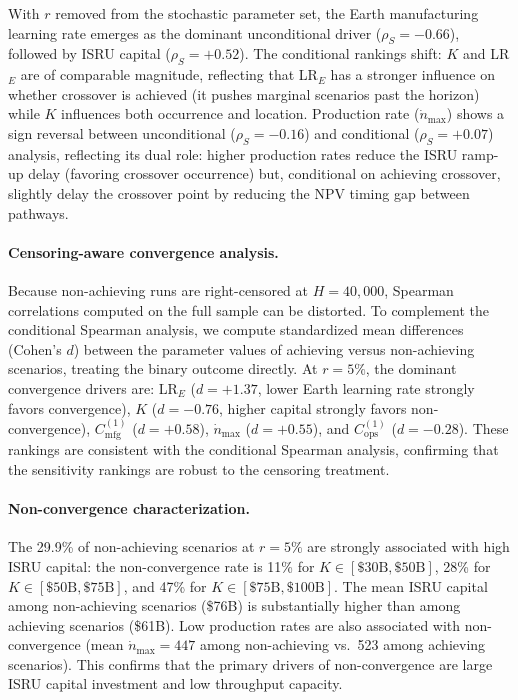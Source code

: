 \documentclass[preprint,12pt]{elsarticle}
\begin{document}
With $r$ removed from the stochastic parameter set, the Earth manufacturing learning rate emerges as the dominant unconditional driver ($\rho_S = -0.66$), followed by ISRU capital ($\rho_S = +0.52$). The conditional rankings shift: $K$ and LR$_E$ are of comparable magnitude, reflecting that LR$_E$ has a stronger influence on whether crossover is achieved (it pushes marginal scenarios past the horizon) while $K$ influences both occurrence and location. Production rate ($\dot{n}_{\max}$) shows a sign reversal between unconditional ($\rho_S = -0.16$) and conditional ($\rho_S = +0.07$) analysis, reflecting its dual role: higher production rates reduce the ISRU ramp-up delay (favoring crossover occurrence) but, conditional on achieving crossover, slightly delay the crossover point by reducing the NPV timing gap between pathways.

\paragraph{Censoring-aware convergence analysis.} Because non-achieving runs are right-censored at $H = 40{,}000$, Spearman correlations computed on the full sample can be distorted. To complement the conditional Spearman analysis, we compute standardized mean differences (Cohen's $d$) between the parameter values of achieving versus non-achieving scenarios, treating the binary outcome directly. At $r = 5\%$, the dominant convergence drivers are: LR$_E$ ($d = +1.37$, lower Earth learning rate strongly favors convergence), $K$ ($d = -0.76$, higher capital strongly favors non-convergence), $C_{\mathrm{mfg}}^{(1)}$ ($d = +0.58$), $\dot{n}_{\max}$ ($d = +0.55$), and $C_{\mathrm{ops}}^{(1)}$ ($d = -0.28$). These rankings are consistent with the conditional Spearman analysis, confirming that the sensitivity rankings are robust to the censoring treatment.

\paragraph{Non-convergence characterization.} The 29.9\% of non-achieving scenarios at $r = 5\%$ are strongly associated with high ISRU capital: the non-convergence rate is 11\% for $K \in [\$30\text{B}, \$50\text{B}]$, 28\% for $K \in [\$50\text{B}, \$75\text{B}]$, and 47\% for $K \in [\$75\text{B}, \$100\text{B}]$. The mean ISRU capital among non-achieving scenarios (\$76B) is substantially higher than among achieving scenarios (\$61B). Low production rates are also associated with non-convergence (mean $\dot{n}_{\max} = 447$ among non-achieving vs.\ 523 among achieving scenarios). This confirms that the primary drivers of non-convergence are large ISRU capital investment and low throughput capacity.
\end{document}
